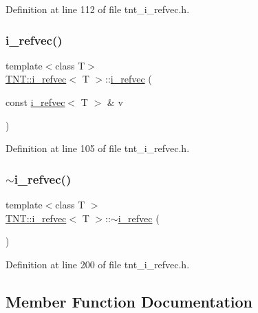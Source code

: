 Definition at line 112 of file tnt\+\_\+i\+\_\+refvec.\+h.

\mbox{\label{classTNT_1_1i__refvec_af9b07aed8d397737c5bceada825b8ada}} 
\subsubsection{\texorpdfstring{i\+\_\+refvec()}{i\_refvec()}\hspace{0.1cm}{\footnotesize\ttfamily [4/4]}}
{\footnotesize\ttfamily template$<$class T$>$ \\
\hyperlink{classTNT_1_1i__refvec}{T\+N\+T\+::i\+\_\+refvec}$<$ T $>$\+::\hyperlink{classTNT_1_1i__refvec}{i\+\_\+refvec} (\begin{DoxyParamCaption}\item[{const \hyperlink{classTNT_1_1i__refvec}{i\+\_\+refvec}$<$ T $>$ \&}]{v }\end{DoxyParamCaption})\hspace{0.3cm}{\ttfamily [inline]}}



Definition at line 105 of file tnt\+\_\+i\+\_\+refvec.\+h.

\mbox{\label{classTNT_1_1i__refvec_a4d43f30694d7ab2ce1a62331cff62279}} 
\subsubsection{\texorpdfstring{$\sim$i\+\_\+refvec()}{~i\_refvec()}}
{\footnotesize\ttfamily template$<$class T $>$ \\
\hyperlink{classTNT_1_1i__refvec}{T\+N\+T\+::i\+\_\+refvec}$<$ T $>$\+::$\sim$\hyperlink{classTNT_1_1i__refvec}{i\+\_\+refvec} (\begin{DoxyParamCaption}{ }\end{DoxyParamCaption})}



Definition at line 200 of file tnt\+\_\+i\+\_\+refvec.\+h.



\subsection{Member Function Documentation}
\mbox{\label{classTNT_1_1i__refvec_a254ea4b6909abc147991b0f3d58d77a7}} 
